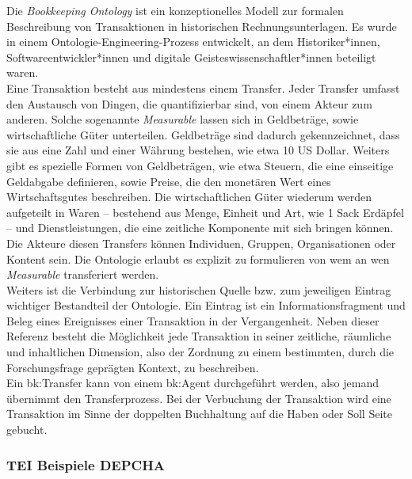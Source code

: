 \documentclass[12pt,a4paper]{article}
\begin{document}
Die \textit{Bookkeeping Ontology} ist ein konzeptionelles Modell zur formalen Beschreibung von Transaktionen in historischen Rechnungsunterlagen. Es wurde in einem Ontologie-Engineering-Prozess entwickelt, an dem Historiker*innen, Softwareentwickler*innen und digitale Geisteswissenschaftler*innen beteiligt waren.  \\
Eine Transaktion besteht aus mindestens einem Transfer. Jeder Transfer umfasst den Austausch von Dingen, die quantifizierbar sind, von einem Akteur zum anderen. Solche sogenannte \textit{Measurable} lassen sich in Geldbeträge, sowie wirtschaftliche Güter unterteilen. Geldbeträge sind dadurch gekennzeichnet, dass sie aus eine Zahl und einer Währung bestehen, wie etwa 10 US Dollar. Weiters gibt es spezielle Formen von Geldbeträgen, wie etwa Steuern, die eine einseitige Geldabgabe definieren, sowie Preise, die den monetären Wert eines Wirtschaftsgutes beschreiben. Die wirtschaftlichen Güter wiederum werden aufgeteilt in Waren -- bestehend aus Menge, Einheit und Art, wie 1 Sack Erdäpfel -- und Dienstleistungen, die eine zeitliche Komponente mit sich bringen können. Die Akteure diesen Transfers können Individuen, Gruppen, Organisationen oder Kontent sein. Die Ontologie erlaubt es explizit zu formulieren von wem an wen \textit{Measurable} transferiert werden.
\\
Weiters ist die Verbindung zur historischen Quelle bzw. zum jeweiligen Eintrag wichtiger Bestandteil der Ontologie. Ein Eintrag ist ein Informationsfragment und Beleg eines Ereignisses einer Transaktion in der Vergangenheit. Neben dieser Referenz besteht die Möglichkeit jede Transaktion in seiner zeitliche, räumliche und inhaltlichen Dimension, also der Zordnung zu einem bestimmten, durch die Forschungsfrage geprägten Kontext, zu beschreiben.
\\
Ein bk:Transfer kann von einem bk:Agent durchgeführt werden, also jemand übernimmt den Transferprozess. Bei der Verbuchung der Transaktion wird eine Transaktion im Sinne der doppelten Buchhaltung auf die Haben oder Soll Seite gebucht. 

\subsubsection{TEI Beispiele DEPCHA}
\end{document}
